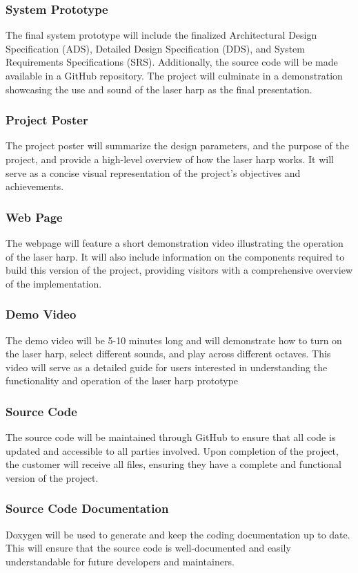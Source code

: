 \subsubsection{System Prototype}
The final system prototype will include the finalized Architectural Design Specification (ADS), Detailed Design Specification (DDS), and System Requirements Specifications (SRS). Additionally, the source code will be made available in a GitHub repository. The project will culminate in a demonstration showcasing the use and sound of the laser harp as the final presentation.
\subsubsection{Project Poster}
The project poster will summarize the design parameters, and the purpose of the project, and provide a high-level overview of how the laser harp works. It will serve as a concise visual representation of the project's objectives and achievements.

\subsubsection{Web Page}
The webpage will feature a short demonstration video illustrating the operation of the laser harp. It will also include information on the components required to build this version of the project, providing visitors with a comprehensive overview of the implementation.

\subsubsection{Demo Video}
The demo video will be 5-10 minutes long and will demonstrate how to turn on the laser harp, select different sounds, and play across different octaves. This video will serve as a detailed guide for users interested in understanding the functionality and operation of the laser harp prototype

\subsubsection{Source Code}
The source code will be maintained through GitHub to ensure that all code is updated and accessible to all parties involved. Upon completion of the project, the customer will receive all files, ensuring they have a complete and functional version of the project.
\subsubsection{Source Code Documentation}
Doxygen will be used to generate and keep the coding documentation up to date. This will ensure that the source code is well-documented and easily understandable for future developers and maintainers.

